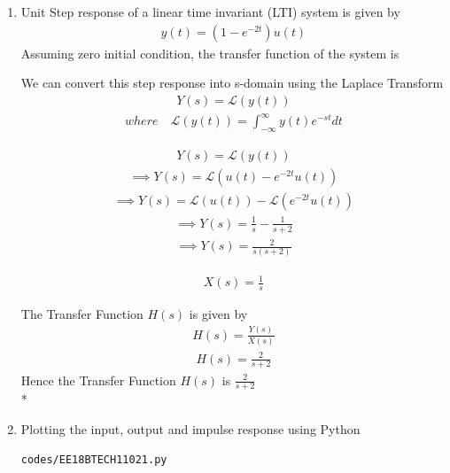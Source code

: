 \begin{enumerate}[label=\thesection.\arabic*.,ref=\thesection.\theenumi]

\item
Unit Step response of a linear time invariant (LTI) system is given by 
\begin{align}
y(t) = (1 - e^{-2t})u(t)
\end{align}
Assuming zero initial condition, the transfer function of the system is

\solution We can convert this step response into s-domain using the Laplace Transform
\begin{align}
Y(s) = \mathcal{L}(y(t))
\end{align}
\begin{align}
where \quad \mathcal{L}(y(t))= \int_{-\infty}^{\infty} y(t)e^{-st} dt
\end{align}

\begin{align}
Y(s) = \mathcal{L}(y(t))
\end{align}
\begin{align}
\implies Y(s) = \mathcal{L}(u(t) - e^{-2t}u(t))
\end{align}
\begin{align}
\implies Y(s) = \mathcal{L}(u(t)) - \mathcal{L}(e^{-2t}u(t))
\end{align}
\begin{align}
\implies Y(s) = \frac{1}{s} - \frac{1}{s+2}
\end{align}
\begin{align}
\implies Y(s) = \frac{2}{s(s+2)}
\end{align}

\begin{align}
X(s) = \frac{1}{s}
\end{align}

The Transfer Function $H(s)$ is given by
\begin{align}
H(s) = \frac{Y(s)}{X(s)}
\end{align}
\begin{align}
H(s) = \frac{2}{s+2}
\end{align}
Hence the Transfer Function $H(s)$ is $\frac{2}{s+2}$\\*


\item Plotting the input, output and impulse response using Python
\solution
\begin{lstlisting}
codes/EE18BTECH11021.py
\end{lstlisting}


\end{enumerate}
